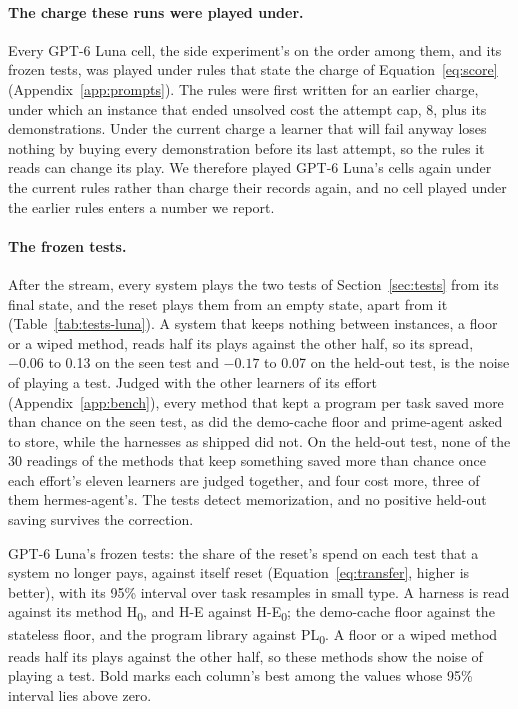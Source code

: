 \paragraph{The charge these runs were played under.}
\label{sec:charge}
Every GPT-6 Luna cell, the side experiment's on the order among them, and its frozen tests, was played under rules that state the charge of Equation~\ref{eq:score} (Appendix~\ref{app:prompts}). The rules were first written for an earlier charge, under which an instance that ended unsolved cost the attempt cap, 8, plus its demonstrations. Under the current charge a learner that will fail anyway loses nothing by buying every demonstration before its last attempt, so the rules it reads can change its play. We therefore played GPT-6 Luna's cells again under the current rules rather than charge their records again, and no cell played under the earlier rules enters a number we report.

\paragraph{The frozen tests.}
After the stream, every system plays the two tests of Section~\ref{sec:tests} from its final state, and the reset plays them from an empty state, apart from it (Table~\ref{tab:tests-luna}). A system that keeps nothing between instances, a floor or a wiped method, reads half its plays against the other half, so its spread, $-0.06$ to 0.13 on the seen test and $-0.17$ to 0.07 on the held-out test, is the noise of playing a test. Judged with the other learners of its effort (Appendix~\ref{app:bench}), every method that kept a program per task saved more than chance on the seen test, as did the demo-cache floor and prime-agent asked to store, while the harnesses as shipped did not. On the held-out test, none of the 30 readings of the methods that keep something saved more than chance once each effort's eleven learners are judged together, and four cost more, three of them hermes-agent's. The tests detect memorization, and no positive held-out saving survives the correction.

\begin{table}[htbp]
\centering
\footnotesize\setlength{\tabcolsep}{3pt}
\begin{adjustbox}{max width=\linewidth}

\end{adjustbox}
\caption{GPT-6 Luna's frozen tests: the share of the reset's spend on each test that a system no longer pays, against itself reset (Equation~\ref{eq:transfer}, higher is better), with its 95\% interval over task resamples in small type. A harness is read against its method H\textsubscript{0}, and \mbox{H-E} against \mbox{H-E\textsubscript{0}}; the demo-cache floor against the stateless floor, and the program library against PL\textsubscript{0}. A floor or a wiped method reads half its plays against the other half, so these methods show the noise of playing a test. Bold marks each column's best among the values whose 95\% interval lies above zero.}
\label{tab:tests-luna}
\end{table}
